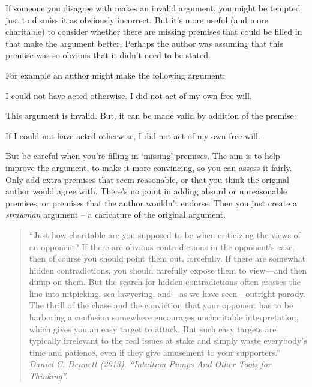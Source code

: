 
If someone you disagree with makes an invalid
argument, you might be tempted just to dismiss it as
obviously incorrect.
But it’s more useful (and more charitable) to consider
whether there are missing premises that could be filled
in that make the argument better.
Perhaps the author was assuming that this
premise was so obvious that it didn’t need to be stated.

For example an author might make the following argument:
\begin{earg}
\prem I could not have acted otherwise.
\conc I did not act of my own free will.
\end{earg}
This argument is invalid. But, it can be made valid by addition of the premise:
\begin{earg}
\prem If I could not have acted otherwise, I did not act of my own free will.
\end{earg}

But be careful when you’re filling in ‘missing’ premises.
The aim is to help improve the argument, to make it
more convincing, so you can assess it fairly.
Only add extra premises that seem reasonable, or that you think
the original author would agree with.
There’s no point in adding absurd or unreasonable
premises, or premises that the author wouldn’t
endorse. Then you just create a \emph{strawman} argument –
a caricature of the original argument.


\begin{quotation}
“Just how charitable are you supposed to be when criticizing the views of an opponent? If there are obvious contradictions in the opponent’s case, then of course you should point them out, forcefully. If there are somewhat hidden contradictions, you should carefully expose them to view—and then dump on them. But the search for hidden contradictions often crosses the line into nitpicking, sea-lawyering, and—as we have seen—outright parody. The thrill of the chase and the conviction that your opponent has to be harboring a confusion somewhere encourages uncharitable interpretation, which gives you an easy target to attack. But such easy targets are typically irrelevant to the real issues at stake and simply waste everybody’s time and patience, even if they give amusement to your supporters.''\\
\emph{Daniel C. Dennett (2013). “Intuition Pumps And Other Tools for Thinking”. }
\end{quotation}


